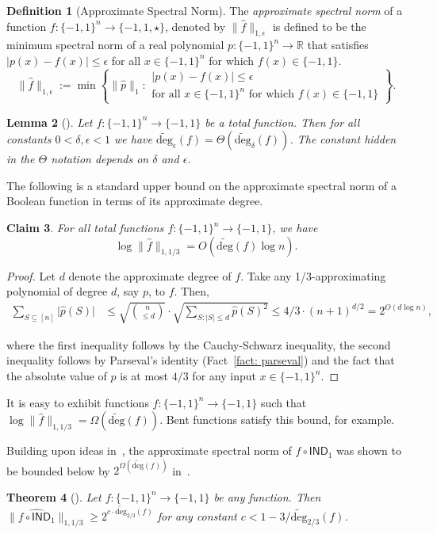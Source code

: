 \documentclass[10pt,a4paper]{article}
\newtheorem{theorem}{Theorem}
\newtheorem{lemma}[theorem]{Lemma}
\newtheorem{claim}[theorem]{Claim}
\theoremstyle{definition}
\newtheorem{definition}[theorem]{Definition}
\newcommand{\bra}[1]{\{#1\}}
\newcommand{\pmone}{\bra{-1,1}}
\newcommand{\R}{\mathbb R}
\newcommand{\wh}{\widehat}
\newcommand{\eps}{\epsilon}
\newcommand{\abs}[1]{\lvert#1\rvert}
\newcommand{\adeg}{\widetilde{\mathrm{deg}}}
\newcommand{\asnorm}[2]{\|\widehat{#1}\|_{1,#2}}
\newcommand{\snorm}[1]{\|\widehat{#1}\|_1}
\newcommand{\IND}{\mathsf{IND}}
\begin{document}
\begin{definition}[Approximate Spectral Norm]\label{defn: awt}
The \emph{approximate spectral norm} of a function  $f : \pmone^n \to \{-1,1,\star\}$, denoted by $\asnorm{f}{\epsilon}$ is defined to be the minimum spectral norm of a real polynomial $p : \pmone^n \to \R$ that satisfies $\abs{p(x) - f(x)} \leq \eps$ for all $x \in \pmone^n$ for which $f(x) \in \pmone$.
\[
\asnorm{f}{\epsilon}:=\min\left\{\snorm{p}:\begin{array}{l}|p(x)-f(x)|\leq\epsilon\\\text{for all }x\in\pmone^n\text{ for which }f(x)\in\pmone\end{array}\right\}.
\]
\end{definition}
\begin{lemma}[\cite{BNRW07}]\label{lem: asnormequiv} 
Let $f:\pmone^n \to \pmone$ be a total function. Then for all constants $0 < \delta, \eps < 1$ we have $\adeg_\eps(f) = \Theta(\adeg_\delta(f))$. The constant hidden in the $\Theta$ notation depends on $\delta$ and $\eps$.
\end{lemma}

The following is a standard upper bound on the approximate spectral norm of a Boolean function in terms of its approximate degree.
\begin{claim}\label{claim: adegnaivelb}
For all total functions $f : \pmone^n \to \pmone$, we have 
\[
\log \asnorm{f}{1/3} = O(\adeg(f) \log n).
\]
\end{claim}
\begin{proof}
Let $d$ denote the approximate degree of $f$.  Take any 1/3-approximating polynomial of degree $d$, say $p$, to $f$.  Then,
\begin{align*}
    \sum_{S \subseteq [n]} \abs{\wh{p}(S)} & \leq \sqrt{\binom{n}{\leq d}} \cdot \sqrt{\sum_{S: |S| \leq d}\wh{p}(S)^2} \leq 4/3 \cdot (n+1)^{d/2} = 2^{O(d \log n)},
\end{align*}

where the first inequality follows by the Cauchy-Schwarz inequality, the second inequality follows by Parseval's identity (Fact~\ref{fact: parseval}) and the fact that the absolute value of $p$ is at most $4/3$ for any input $x \in \pmone^n$.
\end{proof}

It is easy to exhibit functions $f : \pmone^n \to \pmone$ such that $\log \asnorm{f}{1/3} = \Omega(\adeg(f))$.  Bent functions satisfy this bound, for example.

Building upon ideas in~\cite{KP97}, the approximate spectral norm of $f \circ \IND_1$ was shown to be bounded below by $2^{\Omega(\adeg(f))}$ in~\cite{CM17}.
\begin{theorem}[\cite{CM17}]
Let $f:\pmone^n \rightarrow \pmone$ be any function. Then $\asnorm{f\circ\IND_1}{1/3} \geq 2^{c \cdot \adeg_{2/3}(f)}$ for any constant $c < 1 - 3/\adeg_{2/3}(f)$.
\end{theorem}
\end{document}
